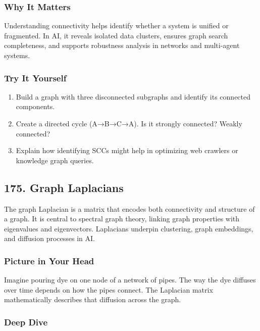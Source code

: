 \documentclass[
  letterpaper,
  DIV=11,
  numbers=noendperiod]{scrreprt}
\providecommand{\tightlist}{%
  \setlength{\itemsep}{0pt}\setlength{\parskip}{0pt}}
\begin{document}
\subsubsection{Why It Matters}\label{why-it-matters-71}

Understanding connectivity helps identify whether a system is unified or
fragmented. In AI, it reveals isolated data clusters, ensures graph
search completeness, and supports robustness analysis in networks and
multi-agent systems.

\subsubsection{Try It Yourself}\label{try-it-yourself-173}

\begin{enumerate}
\def\labelenumi{\arabic{enumi}.}
\tightlist
\item
  Build a graph with three disconnected subgraphs and identify its
  connected components.
\item
  Create a directed cycle (A→B→C→A). Is it strongly connected? Weakly
  connected?
\item
  Explain how identifying SCCs might help in optimizing web crawlers or
  knowledge graph queries.
\end{enumerate}

\subsection{175. Graph Laplacians}\label{graph-laplacians}

The graph Laplacian is a matrix that encodes both connectivity and
structure of a graph. It is central to spectral graph theory, linking
graph properties with eigenvalues and eigenvectors. Laplacians underpin
clustering, graph embeddings, and diffusion processes in AI.

\subsubsection{Picture in Your Head}\label{picture-in-your-head-174}

Imagine pouring dye on one node of a network of pipes. The way the dye
diffuses over time depends on how the pipes connect. The Laplacian
matrix mathematically describes that diffusion across the graph.

\subsubsection{Deep Dive}\label{deep-dive-174}
\end{document}
